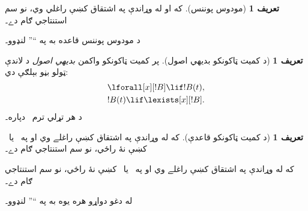 \documentclass[12pt,a4paper,oneside]{report}
\renewcommand{\MP}{\LR{\latinfont MP}}
\renewcommand{\QR}{\LR{\latinfont QR}}
\newcommand{\olfileid}[3]{\gdef\pspart{#1}\gdef\pschapter{#2}\gdef\pssection{#3}}
\gdef\pspart{#2}\gdef\pschapter{#3}\gdef\pssection{}%
\newcommand{\ollabel}[1]{\label{\pspart:\pschapter:\pssection:#1}}
\theoremstyle{definition}
\newtheorem{defn}[thm]{تعريف}
\begin{document}
\label{olpseg:OLP-0114-B007:start}
\begin{defn}[مودوس پوننس]
  که  او  له وړاندې په اشتقاق کښې راغلي
  وي، نو  سم استنتاجي ګام دے۔
\end{defn}
\label{olpseg:OLP-0114-B007:end}

\label{olpseg:OLP-0114-B008:start}
د مودوس پوننس قاعده به په ``\MP'' لنډوو۔
\label{olpseg:OLP-0114-B008:end}

\label{olpseg:OLP-0115-B004:start}
\olfileid{fol}{axd}{qua}
\label{olpseg:OLP-0115-B004:end}

\label{olpseg:OLP-0115-B005:start}
\label{olpseg:OLP-0115-B005:end}

\label{olpseg:OLP-0115-B006:start}
\begin{defn}[د کميت ټاکونکو بديهي اصول]
پر کميت ټاکونکو واکمن \emph{بديهي اصول} د لاندې ټولو بڼو بېلګې دي:
\begin{align}
\ollabel{ax:q1} & \lforall[x][!B] \lif !B(t), \\
\ollabel{ax:q2} & !B(t) \lif \lexists[x][!B].
\end{align}
د هر تړلي ترم~ دپاره۔
\end{defn}
\label{olpseg:OLP-0115-B006:end}

\label{olpseg:OLP-0115-B007:start}
\begin{defn}[د کميت ټاکونکو قاعدې]
\item که  له وړاندې په اشتقاق کښې راغلے وي
  او  په~\LR{$\Gamma$} يا~ کښې نۀ راځي، نو
   سم استنتاجي ګام دے۔
\item که  له وړاندې په اشتقاق کښې راغلے وي
  او  په~\LR{$\Gamma$} يا~ کښې نۀ راځي، نو
   سم استنتاجي ګام دے۔
\end{defn}
\label{olpseg:OLP-0115-B007:end}

\label{olpseg:OLP-0115-B008:start}
له دغو دواړو هره يوه به په ``\QR'' لنډوو۔
\label{olpseg:OLP-0115-B008:end}

\label{olpseg:OLP-0116-B004:start}
\olfileid{fol}{axd}{pro}
\label{olpseg:OLP-0116-B004:end}

\label{olpseg:OLP-0116-B005:start}
\label{olpseg:OLP-0116-B005:end}
\end{document}
